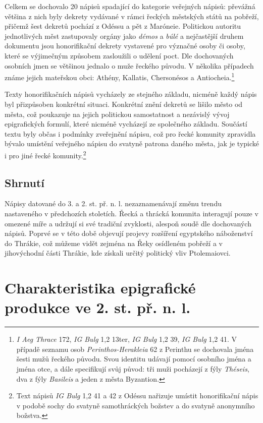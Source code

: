 Celkem se dochovalo 20 nápisů spadající do kategorie veřejných nápisů: převážná většina z nich byly dekrety vydávané v rámci řeckých městských států na pobřeží, přičemž šest dekretů pochází z Odéssu a pět z Maróneie. Politickou autoritu jednotlivých měst zastupovaly orgány jako {\em démos} a {\em búlé} a nejčastější druhem dokumentu jsou honorifikační dekrety vystavené pro význačné osoby či osoby, které se výjimečným způsobem zasloužili o udělení poct. Dle dochovaných osobních jmen se většinou jednalo o muže řeckého původu. V několika případech známe jejich mateřskou obci: Athény, Kallatis, Chersonésos a Antiocheia.\footnote{{\em I Aeg Thrace} 172, {\em IG Bulg} 1,2 13ter, {\em IG Bulg} 1,2 39, {\em IG Bulg} 1,2 41. V případě seznamu osob {\em Perinthos-Herakleia} 62 z Perinthu se dochovala jména šesti mužů řeckého původu. Svou identitu udávají pomocí osobního jména a jména otce, a dále specifikují svůj původ: tři muži pocházejí z fýly {\em Théseis}, dva z fýly {\em Basileis} a jeden z města Byzantion.}

Texty honorifikačních nápisů vycházely ze stejného základu, nicméně každý nápis byl přizpůsoben konkrétní situaci. Konkrétní znění dekretů se lišilo město od města, což poukazuje na jejich politickou samostatnost a nezávislý vývoj epigrafických formulí, které nicméně vycházejí ze společného základu. Součástí textu byly občas i podmínky zveřejnění nápisu, což pro řecké komunity zpravidla bývalo umístění veřejného nápisu do svatyně patrona daného města, jak je typické i pro jiné řecké komunity.\footnote{Text nápisů {\em IG Bulg} 1,2 41 a 42 z Odéssu nařizuje umístit honorifikační nápis v podobě sochy do svatyně samothráckých božstev a do svatyně anonymního božstva.}

\subsection[shrnutí-10]{Shrnutí}

Nápisy datované do 3. a 2. st. př. n. l. nezaznamenávají změnu trendu nastaveného v předchozích stoletích. Řecká a thrácká komunita interagují pouze v omezené míře a udržují si své tradiční zvyklosti, alespoň soudě dle dochovaných nápisů. Poprvé se v této době objevují projevy rozšíření egyptského náboženství do Thrákie, což můžeme vidět zejména na Řeky osídleném pobřeží a v jihovýchodní části Thrákie, kde získali určitý politický vliv Ptolemaiovci.

\section[charakteristika-epigrafické-produkce-ve-2.-st.-př.-n.-l.]{Charakteristika epigrafické produkce ve 2. st. př. n. l.}

